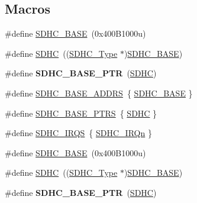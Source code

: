 \subsection*{Macros}
\begin{DoxyCompactItemize}
\item 
\#define \hyperlink{group__SDHC__Peripheral__Access__Layer_gae62cd2bf9b9c484123918db65cc4834b}{S\+D\+H\+C\+\_\+\+B\+A\+SE}~(0x400\+B1000u)
\item 
\#define \hyperlink{group__SDHC__Peripheral__Access__Layer_gadfa975565f8f38eb596ca3ed92df30c8}{S\+D\+HC}~((\hyperlink{structSDHC__Type}{S\+D\+H\+C\+\_\+\+Type} $\ast$)\hyperlink{group__SDHC__Peripheral__Access__Layer_gae62cd2bf9b9c484123918db65cc4834b}{S\+D\+H\+C\+\_\+\+B\+A\+SE})
\item 
\#define {\bfseries S\+D\+H\+C\+\_\+\+B\+A\+S\+E\+\_\+\+P\+TR}~(\hyperlink{group__SDHC__Peripheral__Access__Layer_gadfa975565f8f38eb596ca3ed92df30c8}{S\+D\+HC})\hypertarget{group__SDHC__Peripheral__Access__Layer_gaf6d94732d48040eef799143f86be859c}{}\label{group__SDHC__Peripheral__Access__Layer_gaf6d94732d48040eef799143f86be859c}

\item 
\#define \hyperlink{group__SDHC__Peripheral__Access__Layer_gac247c4777a4c8704d90501a085108593}{S\+D\+H\+C\+\_\+\+B\+A\+S\+E\+\_\+\+A\+D\+D\+RS}~\{ \hyperlink{group__SDHC__Peripheral__Access__Layer_gae62cd2bf9b9c484123918db65cc4834b}{S\+D\+H\+C\+\_\+\+B\+A\+SE} \}
\item 
\#define \hyperlink{group__SDHC__Peripheral__Access__Layer_gaba68469bfde58472af9853b68fee61de}{S\+D\+H\+C\+\_\+\+B\+A\+S\+E\+\_\+\+P\+T\+RS}~\{ \hyperlink{group__SDHC__Peripheral__Access__Layer_gadfa975565f8f38eb596ca3ed92df30c8}{S\+D\+HC} \}
\item 
\#define \hyperlink{group__SDHC__Peripheral__Access__Layer_gac8a2a352713668bfc1ee4dc28bb16783}{S\+D\+H\+C\+\_\+\+I\+R\+QS}~\{ \hyperlink{group__Interrupt__vector__numbers_gga666eb0caeb12ec0e281415592ae89083a3ef698a0344956fa80957f89eded8f95}{S\+D\+H\+C\+\_\+\+I\+R\+Qn} \}
\item 
\#define \hyperlink{group__SDHC__Peripheral__Access__Layer_gae62cd2bf9b9c484123918db65cc4834b}{S\+D\+H\+C\+\_\+\+B\+A\+SE}~(0x400\+B1000u)
\item 
\#define \hyperlink{group__SDHC__Peripheral__Access__Layer_gadfa975565f8f38eb596ca3ed92df30c8}{S\+D\+HC}~((\hyperlink{structSDHC__Type}{S\+D\+H\+C\+\_\+\+Type} $\ast$)\hyperlink{group__SDHC__Peripheral__Access__Layer_gae62cd2bf9b9c484123918db65cc4834b}{S\+D\+H\+C\+\_\+\+B\+A\+SE})
\item 
\#define {\bfseries S\+D\+H\+C\+\_\+\+B\+A\+S\+E\+\_\+\+P\+TR}~(\hyperlink{group__SDHC__Peripheral__Access__Layer_gadfa975565f8f38eb596ca3ed92df30c8}{S\+D\+HC})\hypertarget{group__SDHC__Peripheral__Access__Layer_gaf6d94732d48040eef799143f86be859c}{}\label{group__SDHC__Peripheral__Access__Layer_gaf6d94732d48040eef799143f86be859c}


\end{DoxyCompactItemize}
